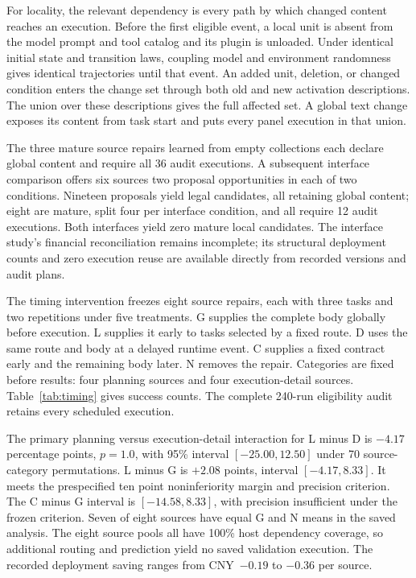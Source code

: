\documentclass{ecai}
\begin{document}
For locality, the relevant dependency is every path by which changed content reaches an execution. Before the first eligible event, a local unit is absent from the model prompt and tool catalog and its plugin is unloaded. Under identical initial state and transition laws, coupling model and environment randomness gives identical trajectories until that event. An added unit, deletion, or changed condition enters the change set through both old and new activation descriptions. The union over these descriptions gives the full affected set. A global text change exposes its content from task start and puts every panel execution in that union.

The three mature source repairs learned from empty collections each declare global content and require all 36 audit executions. A subsequent interface comparison offers six sources two proposal opportunities in each of two conditions. Nineteen proposals yield legal candidates, all retaining global content; eight are mature, split four per interface condition, and all require 12 audit executions. Both interfaces yield zero mature local candidates. The interface study's financial reconciliation remains incomplete; its structural deployment counts and zero execution reuse are available directly from recorded versions and audit plans.

The timing intervention freezes eight source repairs, each with three tasks and two repetitions under five treatments. G supplies the complete body globally before execution. L supplies it early to tasks selected by a fixed route. D uses the same route and body at a delayed runtime event. C supplies a fixed contract early and the remaining body later. N removes the repair. Categories are fixed before results: four planning sources and four execution-detail sources. Table~\ref{tab:timing} gives success counts. The complete 240-run eligibility audit retains every scheduled execution.

The primary planning versus execution-detail interaction for L minus D is $-4.17$ percentage points, $p=1.0$, with 95\% interval $[-25.00,12.50]$ under 70 source-category permutations. L minus G is $+2.08$ points, interval $[-4.17,8.33]$. It meets the prespecified ten point noninferiority margin and precision criterion. The C minus G interval is $[-14.58,8.33]$, with precision insufficient under the frozen criterion. Seven of eight sources have equal G and N means in the saved analysis. The eight source pools all have 100\% host dependency coverage, so additional routing and prediction yield no saved validation execution. The recorded deployment saving ranges from CNY~$-0.19$ to $-0.36$ per source.
\end{document}
